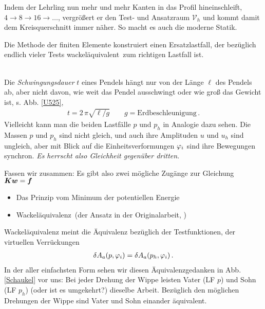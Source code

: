 Indem der Lehrling nun mehr und mehr Kanten in das Profil hineinschleift, $4 \rightarrow 8 \rightarrow 16 \rightarrow \ldots$, vergr\"{o}{\ss}ert er den Test- und Ansatzraum $\mathcal{V}_h$ und kommt damit dem Kreisquerschnitt immer n\"{a}her. So macht es auch die moderne Statik. \\

\hspace*{-12pt}\colorbox{highlightBlue}{\parbox{0.98\textwidth}{ Die Methode der finiten Elemente konstruiert einen Ersatzlastfall, der bez\"{u}glich endlich vieler Tests \glq wackel\"{a}quivalent\grq\ zum richtigen Lastfall ist.}}\\

Die {\em Schwingungsdauer\/} $t$ eines Pendels h\"{a}ngt nur von der L\"{a}nge $ \ell$ des Pendels ab, aber nicht davon, wie weit das Pendel ausschwingt oder wie gro{\ss} das Gewicht ist, s. Abb. \ref{U525},
\begin{align}
t = 2\,\pi \sqrt{{\ell}/{g}} \qquad g = \text{Erdbeschleunigung}\,.
\end{align}
Vielleicht kann man die beiden Lastf\"{a}lle $p$ und $p_h $ in Analogie dazu sehen. Die \glq Massen\grq{} $p$ und $p_h$ sind nicht gleich, und auch ihre \glq Amplituden\grq{} $u$ und $u_h$ sind ungleich, aber mit Blick auf die Einheitsverformungen $\varphi_i $ sind ihre Bewegungen \glq synchron\grq. {\em Es herrscht also Gleichheit gegen\"{u}ber dritten\/}.

Fassen wir zusammen: Es gibt also zwei m\"{o}gliche Zug\"{a}nge zur Gleichung $\mbox{\boldmath $K$}\mbox{\boldmath $w$} = \mbox{\boldmath $f$}$\\
\begin{itemize}
  \item Das Prinzip vom Minimum der potentiellen  Energie
  \item \glq Wackel\"{a}quivalenz\grq\ (der Ansatz in der Originalarbeit, \cite{Turner})
\end{itemize}
Wackel\"{a}quivalenz meint die \"{A}quivalenz bez\"{u}glich der Testfunktionen, der virtuellen Verr\"{u}ckungen
\begin{align}
\delta A_a(p,\varphi_i) = \delta A_a(p_h,\varphi_i)\,.
\end{align}
In der aller einfachsten Form sehen wir diesen \"{A}quivalenzgedanken in Abb. \ref{Schaukel} vor uns: Bei jeder Drehung der Wippe leisten Vater (LF $p$) und Sohn (LF $p_h$) (oder ist es umgekehrt?) dieselbe Arbeit. Bez\"{u}glich den m\"{o}glichen Drehungen der Wippe sind Vater und Sohn einander \"{a}quivalent.



